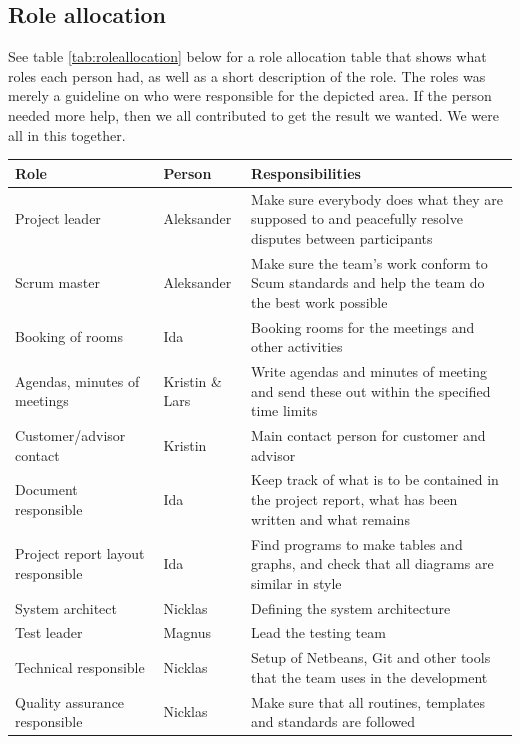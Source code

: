 \subsection{Role allocation}
See table \ref{tab:roleallocation} below for a role allocation table that shows what roles each person had, as well as a short description of the role. The roles was merely a guideline on who were responsible for the depicted area. If the person needed more help, then we all contributed to get the result we wanted. We were all in this together.
\begin{table}[h!]
\begin{center}
\begin{tabularx}{\linewidth}{>{\setlength\hsize{.5\hsize}}X|>{\setlength\hsize{0.3\hsize}}X|>{\setlength\hsize{1\hsize}}X} \hline
\textbf{Role} & \textbf{Person} & \textbf{Responsibilities} \\ \hline \hline
Project leader & Aleksander & Make sure everybody does what they are supposed to and peacefully resolve disputes between participants \\  \hline
Scrum master & Aleksander & Make sure the team’s work conform to Scum standards and help the team do the best work possible \\ \hline
Booking of rooms & Ida & Booking rooms for the meetings and other activities \\ \hline
Agendas, minutes of meetings & Kristin \& Lars &Write agendas and minutes of meeting and send these out within the specified time limits \\ \hline
Customer/advisor contact & Kristin & Main contact person for customer and advisor \\ \hline
Document responsible & Ida &Keep track of what is to be contained in the project report, what has been written and what remains \\ \hline
Project report layout responsible & Ida &Find programs to make tables and graphs, and check that all diagrams are similar in style \\ \hline
System architect & Nicklas & Defining the system architecture \\ \hline
Test leader & Magnus & Lead the testing team \\ \hline
Technical responsible & Nicklas & Setup of Netbeans, Git and other tools that the team uses in the development \\ \hline
Quality assurance responsible & Nicklas & Make sure that all routines, templates and standards are followed \\ \hline

\end{tabularx}
\end{center}
\end{table}
